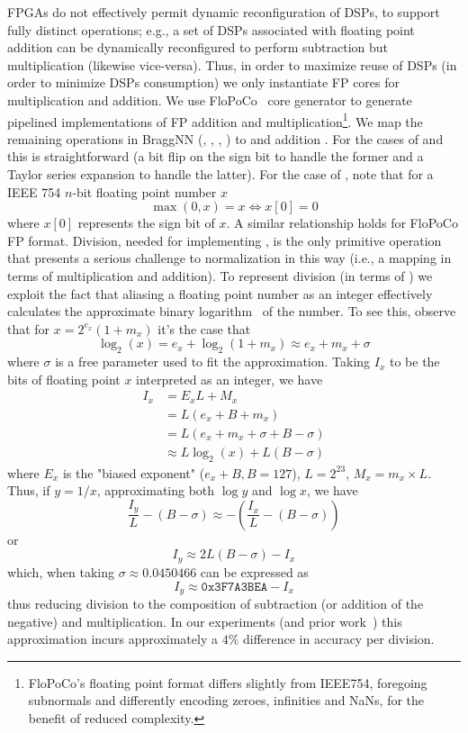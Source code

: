 {{{{FPGAs do not effectively permit dynamic reconfiguration of DSPs, to support fully distinct operations; e.g., a set of DSPs associated with floating point addition can be dynamically reconfigured to perform subtraction but multiplication (likewise vice-versa).
Thus, in order to maximize reuse of DSPs (in order to minimize DSPs consumption) we only instantiate FP cores for multiplication and addition.
We use FloPoCo~\cite{8877424} core generator to generate pipelined implementations of FP addition and multiplication\footnote{FloPoCo's floating point format differs slightly from IEEE754, foregoing subnormals and differently encoding zeroes, infinities and NaNs, for the benefit of reduced complexity.}.
We map the remaining operations in BraggNN (, , , ) to  and addition .
For the cases of  and  this is straightforward (a bit flip on the sign bit to handle the former and a Taylor series expansion to handle the latter).
For the case of , note that for a IEEE 754 $n$-bit floating point number $x$
$$
\max(0, x) = x \iff x[0] = 0
$$
where $x[0]$ represents the sign bit of $x$.
A similar relationship holds for FloPoCo FP format.
Division, needed for implementing , is the only primitive operation that presents a serious challenge to normalization in this way (i.e., a mapping in terms of multiplication and addition).
To represent division (in terms of ) we exploit the fact that aliasing a floating point number as an integer effectively calculates the approximate binary logarithm~\cite{enwiki:1081681080} of the number.
To see this, observe that for $x=2^{e_{x}}(1+m_{x})$ it's the case that
\[
	\log _{2}(x)=e_{x}+\log _{2}(1+m_{x})	\approx e_{x} + m_x + \sigma
\]
where $\sigma$ is a free parameter used to fit the approximation.
Taking $I_x$ to be the bits of floating point $x$ interpreted as an integer, we have 
\[
\begin{aligned}
	I_{x}&=E_{x}L+M_{x}\\
	&=L(e_{x}+B+m_{x})\\
	&=L(e_{x}+m_{x}+\sigma +B-\sigma )\\
	&\approx L\log _{2}(x)+L(B-\sigma )
\end{aligned}
\]
where $E_{x}$ is the "biased exponent" ($e_x + B, B = 127$), $L = 2^{23}$, $M_{x}=m_{x}\times L$.
Thus, if $y = 1/x$, approximating both $\log y$ and $\log x$, we have 
\[
	{\frac {I_{y}}{L}}-(B-\sigma )\approx -\left({\frac {I_{x}}{L}}-(B-\sigma )\right)	
\]
or
\[
	I_{y}\approx 2 L(B-\sigma ) - I_{x}
\]
which, when taking $\sigma \approx 0.0450466$ can be expressed as 
\[
	I_y \approx \texttt{0x3F7A3BEA} - I_x
\]
thus reducing division to the composition of subtraction (or addition of the negative) and multiplication.
In our experiments (and prior work~\cite{10.1007/978-0-387-72258-0_14}) this approximation incurs approximately a $4\%$ difference in accuracy per division.

}}}}
